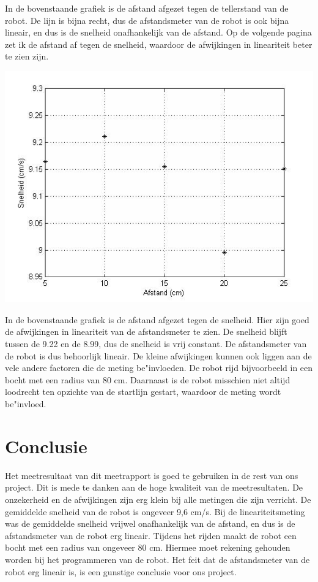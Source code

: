 \documentclass{report}
\begin{document}
In de bovenstaande grafiek is de afstand afgezet tegen de tellerstand van de robot. De lijn is bijna recht, dus de afstandsmeter van de robot is ook bijna lineair, en dus is de snelheid onafhankelijk van de afstand.  Op de volgende pagina zet ik de afstand af tegen de snelheid, waardoor de afwijkingen in lineariteit beter te zien zijn. 
\begin{center}
\includegraphics[width=150mm] {afstand-snelheid.jpg}
\end{center}
In de bovenstaande grafiek is de afstand afgezet tegen de snelheid. Hier zijn goed de afwijkingen in lineariteit van de afstandsmeter te zien. De snelheid blijft tussen de 9.22 en de 8.99, dus de snelheid is vrij constant. De afstandsmeter van de robot is dus behoorlijk lineair. De kleine afwijkingen kunnen ook liggen aan de vele andere factoren die de meting be"invloeden. De robot rijd bijvoorbeeld in een bocht met een radius van 80 cm. Daarnaast is de robot misschien niet altijd loodrecht ten opzichte van de startlijn gestart, waardoor de meting wordt be"invloed.
\newpage
\chapter{Conclusie}
Het meetresultaat van dit meetrapport is goed te gebruiken in de rest van ons project. Dit is mede te danken aan de hoge kwaliteit van de meetresultaten. De onzekerheid en de afwijkingen zijn erg klein bij alle metingen die zijn verricht. De gemiddelde snelheid van de robot is ongeveer 9,6 cm/s. Bij de lineariteitsmeting was de gemiddelde snelheid vrijwel onafhankelijk van de afstand, en dus is de afstandsmeter van de robot erg lineair. Tijdens het rijden maakt de robot een bocht met een radius van ongeveer 80 cm. Hiermee moet rekening gehouden worden bij het programmeren van de robot. Het feit dat de afstandsmeter van de robot erg lineair is, is een gunstige conclusie voor ons project.
\end{document}
